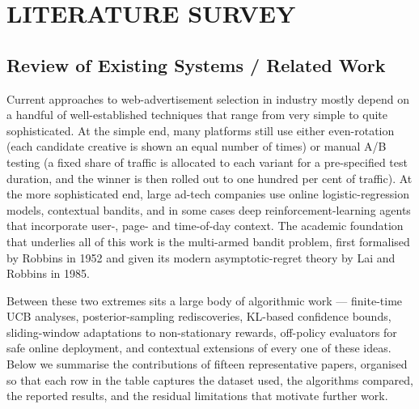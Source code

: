 \section{LITERATURE SURVEY}

\subsection{Review of Existing Systems / Related Work}
Current approaches to web-advertisement selection in industry mostly depend on a handful of well-established techniques that range from very simple to quite sophisticated. At the simple end, many platforms still use either even-rotation (each candidate creative is shown an equal number of times) or manual A/B testing (a fixed share of traffic is allocated to each variant for a pre-specified test duration, and the winner is then rolled out to one hundred per cent of traffic). At the more sophisticated end, large ad-tech companies use online logistic-regression models, contextual bandits, and in some cases deep reinforcement-learning agents that incorporate user-, page- and time-of-day context. The academic foundation that underlies all of this work is the multi-armed bandit problem, first formalised by Robbins in 1952 and given its modern asymptotic-regret theory by Lai and Robbins in 1985.

Between these two extremes sits a large body of algorithmic work --- finite-time UCB analyses, posterior-sampling rediscoveries, KL-based confidence bounds, sliding-window adaptations to non-stationary rewards, off-policy evaluators for safe online deployment, and contextual extensions of every one of these ideas. Below we summarise the contributions of fifteen representative papers, organised so that each row in the table captures the dataset used, the algorithms compared, the reported results, and the residual limitations that motivate further work.

